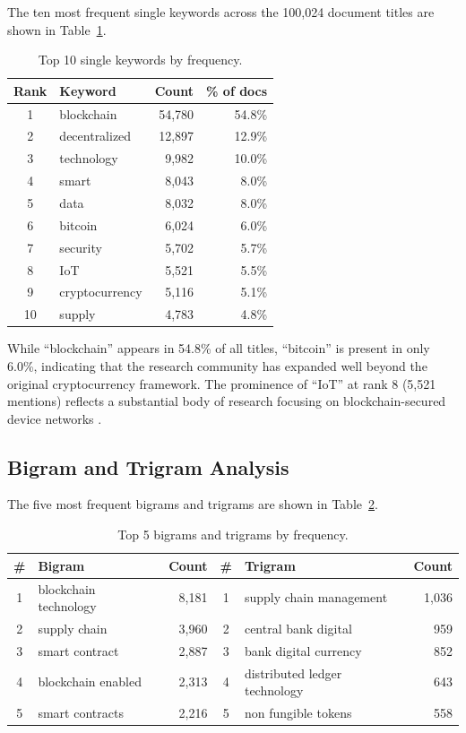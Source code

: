 \documentclass[11pt]{article}
\begin{document}
The ten most frequent single keywords across the 100,024 document titles are shown in Table~\ref{tab:keywords}.

\begin{table}[h]
\centering
\caption{Top 10 single keywords by frequency.}
\label{tab:keywords}
\begin{tabular}{clrr}
\toprule
Rank & Keyword & Count & \% of docs \\
\midrule
1 & blockchain & 54,780 & 54.8\% \\
2 & decentralized & 12,897 & 12.9\% \\
3 & technology & 9,982 & 10.0\% \\
4 & smart & 8,043 & 8.0\% \\
5 & data & 8,032 & 8.0\% \\
6 & bitcoin & 6,024 & 6.0\% \\
7 & security & 5,702 & 5.7\% \\
8 & IoT & 5,521 & 5.5\% \\
9 & cryptocurrency & 5,116 & 5.1\% \\
10 & supply & 4,783 & 4.8\% \\
\bottomrule
\end{tabular}
\end{table}

While ``blockchain'' appears in 54.8\% of all titles, ``bitcoin'' is present in only 6.0\%, indicating that the research community has expanded well beyond the original cryptocurrency framework. The prominence of ``IoT'' at rank 8 (5,521 mentions) reflects a substantial body of research focusing on blockchain-secured device networks \citep{christidis2016blockchains, fernandez2018review, reyna2018blockchain}.

\subsection{Bigram and Trigram Analysis}

The five most frequent bigrams and trigrams are shown in Table~\ref{tab:ngrams}.

\begin{table}[h]
\centering
\caption{Top 5 bigrams and trigrams by frequency.}
\label{tab:ngrams}
\begin{tabular}{clr|clr}
\toprule
\# & Bigram & Count & \# & Trigram & Count \\
\midrule
1 & blockchain technology & 8,181 & 1 & supply chain management & 1,036 \\
2 & supply chain & 3,960 & 2 & central bank digital & 959 \\
3 & smart contract & 2,887 & 3 & bank digital currency & 852 \\
4 & blockchain enabled & 2,313 & 4 & distributed ledger technology & 643 \\
5 & smart contracts & 2,216 & 5 & non fungible tokens & 558 \\
\bottomrule
\end{tabular}
\end{table}
\end{document}
